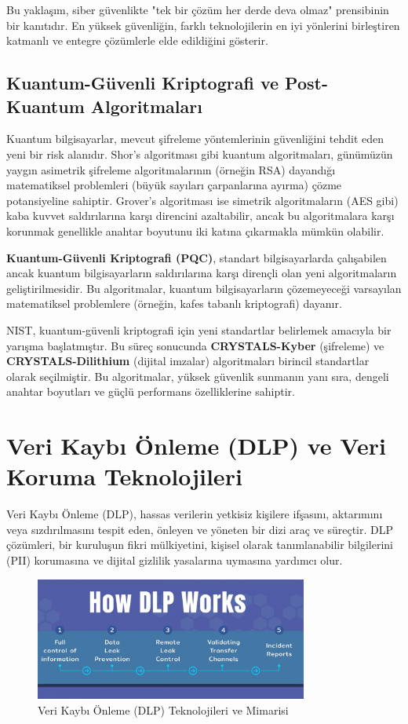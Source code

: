 Bu yaklaşım, siber güvenlikte "tek bir çözüm her derde deva olmaz" prensibinin bir kanıtıdır. En yüksek güvenliğin, farklı teknolojilerin en iyi yönlerini birleştiren katmanlı ve entegre çözümlerle elde edildiğini gösterir.

\subsection{Kuantum-Güvenli Kriptografi ve Post-Kuantum Algoritmaları}

Kuantum bilgisayarlar, mevcut şifreleme yöntemlerinin güvenliğini tehdit eden yeni bir risk alanıdır. Shor's algoritması gibi kuantum algoritmaları, günümüzün yaygın asimetrik şifreleme algoritmalarının (örneğin RSA) dayandığı matematiksel problemleri (büyük sayıları çarpanlarına ayırma) çözme potansiyeline sahiptir. Grover's algoritması ise simetrik algoritmaların (AES gibi) kaba kuvvet saldırılarına karşı direncini azaltabilir, ancak bu algoritmalara karşı korunmak genellikle anahtar boyutunu iki katına çıkarmakla mümkün olabilir.

\textbf{Kuantum-Güvenli Kriptografi (PQC)}, standart bilgisayarlarda çalışabilen ancak kuantum bilgisayarların saldırılarına karşı dirençli olan yeni algoritmaların geliştirilmesidir. Bu algoritmalar, kuantum bilgisayarların çözemeyeceği varsayılan matematiksel problemlere (örneğin, kafes tabanlı kriptografi) dayanır.

NIST, kuantum-güvenli kriptografi için yeni standartlar belirlemek amacıyla bir yarışma başlatmıştır. Bu süreç sonucunda \textbf{CRYSTALS-Kyber} (şifreleme) ve \textbf{CRYSTALS-Dilithium} (dijital imzalar) algoritmaları birincil standartlar olarak seçilmiştir. Bu algoritmalar, yüksek güvenlik sunmanın yanı sıra, dengeli anahtar boyutları ve güçlü performans özelliklerine sahiptir.

\section{Veri Kaybı Önleme (DLP) ve Veri Koruma Teknolojileri}

Veri Kaybı Önleme (DLP), hassas verilerin yetkisiz kişilere ifşasını, aktarımını veya sızdırılmasını tespit eden, önleyen ve yöneten bir dizi araç ve süreçtir. DLP çözümleri, bir kuruluşun fikri mülkiyetini, kişisel olarak tanımlanabilir bilgilerini (PII) korumasına ve dijital gizlilik yasalarına uymasına yardımcı olur.

\begin{figure}[H]
    \centering
    \includegraphics[width=0.8\textwidth]{img/dlp.png}
    \caption{Veri Kaybı Önleme (DLP) Teknolojileri ve Mimarisi}
    \label{fig:dlp}
\end{figure}


